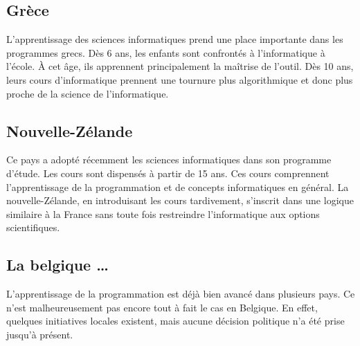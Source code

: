 \subsection{Grèce}
L'apprentissage des sciences informatiques prend une place importante dans les programmes grecs. Dès 6 ans, les enfants sont confrontés à l'informatique à l'école. À cet âge, ils apprennent principalement la maîtrise de l'outil. Dès 10 ans, leurs cours d'informatique prennent une tournure plus algorithmique et donc plus proche de la science de l'informatique.

\subsection{Nouvelle-Zélande}
Ce pays a adopté récemment les sciences informatiques dans son programme d'étude. Les cours sont dispensés à partir de 15 ans. Ces cours comprennent l'apprentissage de la programmation et de concepts informatiques en général. La nouvelle-Zélande, en introduisant les cours tardivement, s'inscrit dans une logique similaire à la France sans toute fois restreindre l'informatique aux options scientifiques.

\subsection{La belgique \ldots}
L'apprentissage de la programmation est déjà bien avancé dans plusieurs pays. Ce n'est malheureusement pas encore tout à fait le cas en Belgique. En effet, quelques initiatives locales existent, mais aucune décision politique n'a été prise jusqu'à présent.
